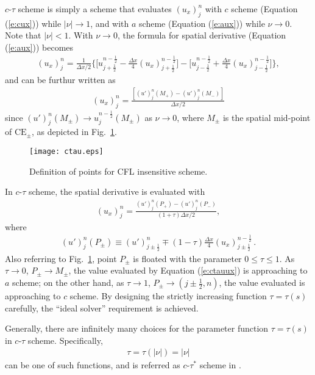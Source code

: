 \documentclass[11pt,dvips]{article}
\renewcommand{\figurename}{Fig.}
\numberwithin{equation}{section}
\begin{document}
$c$-$\tau$ scheme is simply a scheme that evaluates $(u_x)_j^n$ with $c$ scheme
(Equation (\ref{e:cux})) while $|\nu|\rightarrow1$, and with $a$ scheme
(Equation (\ref{e:aux})) while $\nu\rightarrow0$.  Note that $|\nu|<1$.  With
$\nu\rightarrow0$, the formula for spatial derivative (Equation (\ref{e:aux}))
becomes
\begin{align*}
  (u_x)_j^n = \frac{1}{\Delta x/2}\Big\{
      \Big[ u_{j+\frac{1}{2}}^{n-\frac{1}{2}}
         - \frac{\Delta x}{4}(u_x)_{j+\frac{1}{2}}^{n-\frac{1}{2}}
      \Big]
    - \Big[ u_{j-\frac{1}{2}}^{n-\frac{1}{2}}
         + \frac{\Delta x}{4}(u_x)_{j-\frac{1}{2}}^{n-\frac{1}{2}}
      \Big]
  \Big\},
\end{align*}
and can be furthur written as
\begin{align*}
  (u_x)_j^n =
    \frac{\left[(u')_j^n(M_+) - (u')_j^n(M_-)\right]}{\Delta x/2}
\end{align*}
since $(u')_j^n(M_{\pm}) \rightarrow u_j^{n-\frac{1}{2}}(M_{\pm})$ as
$\nu\rightarrow0$, where $M_{\pm}$ is the spatial mid-point of
$\mathrm{CE}_{\pm}$, as depicted in \figurename~\ref{f:ctau}.

\begin{figure}[htbp]
  \centering
  \texttt{[image: ctau.eps]}
  \caption{Definition of points for CFL insensitive scheme.}
  \label{f:ctau}
\end{figure}

In $c$-$\tau$ scheme, the spatial derivative is evaluated with
\begin{align}
  (u_x)_j^n =
    \frac{(u')_j^n(P_+) - (u')_j^n(P_-)}
         {(1+\tau)\Delta x/2}, \label{e:ctauux}
\end{align}
where
\begin{align}
  (u')_j^n(P_{\pm}) \equiv
        (u')_{j\pm\frac{1}{2}}^n
    \mp (1-\tau)\frac{\Delta x}{4}(u_x)_{j\pm\frac{1}{2}}^{n-\frac{1}{2}}
  \,. \label{e:upp}
\end{align}
Also referring to \figurename~\ref{f:ctau}, point $P_{\pm}$ is floated with the
parameter $0\le\tau\le1$.  As $\tau\rightarrow0$, $P_{\pm}\rightarrow M_{\pm}$,
the value evaluated by Equation (\ref{e:ctauux}) is approaching to $a$ scheme;
on the other hand, as $\tau\rightarrow1$,
$P_{\pm}\rightarrow(j\pm\frac{1}{2},n)$, the value evaluated is approaching to
$c$ scheme.  By designing the strictly increasing function $\tau = \tau(s)$
carefully\cite{chang_multi-dimensional_2003}, the ``ideal solver'' requirement
is achieved.

Generally, there are infinitely many choices for the parameter function
$\tau=\tau(s)$ in $c$-$\tau$ scheme.  Specifically,
\begin{align}
  \tau = \tau(|\nu|) = |\nu| \label{e:ctau*}
\end{align}
can be one of such functions, and is referred as $c$-$\tau^*$ scheme in
\cite{chang_courant_2002, chang_multi-dimensional_2003}.
\end{document}
